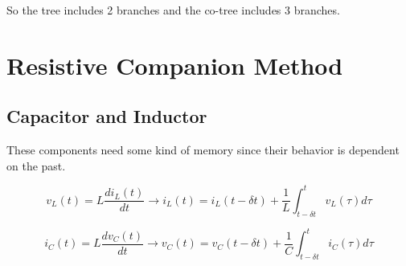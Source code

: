 So the tree includes 2 branches and the co-tree includes 3 branches.

\section{Resistive Companion Method}

\subsection{Capacitor and Inductor}
These components need some kind of memory since their behavior is dependent on the past.

\begin{equation}
        v_L(t) = L \frac{di_L(t)}{dt} \rightarrow i_L(t) = i_L(t-\delta t)+\frac{1}{L} \int_{t-\delta t}^t v_L(\tau)d\tau
\end{equation}

\begin{equation}
        i_C(t) = L \frac{dv_C(t)}{dt} \rightarrow v_C(t) = v_C(t-\delta t)+\frac{1}{C} \int_{t-\delta t}^t i_C(\tau)d\tau
\end{equation}

